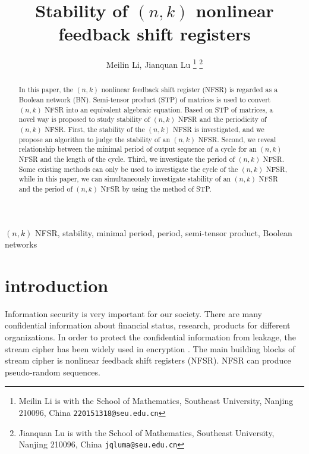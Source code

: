 \documentclass[conference]{IEEEtran}
\title{\LARGE \bf
Stability of $(n,k)$ nonlinear feedback shift registers}
\author{Meilin Li, Jianquan Lu
\thanks{Meilin Li is with the School of Mathematics, Southeast
University, Nanjing 210096, China {\tt\small 220151318@seu.edu.cn}}
\thanks{Jianquan Lu is with the School of Mathematics, Southeast
University, Nanjing 210096, China
{\tt\small jqluma@seu.edu.cn}}}
\begin{document}
\maketitle
\thispagestyle{empty}
\pagestyle{empty}

\begin{abstract}
In this paper, the $(n,k)$ nonlinear feedback shift register (NFSR) is regarded as a Boolean network (BN). Semi-tensor product (STP) of matrices is used to convert $(n,k)$ NFSR into an equivalent algebraic equation. Based on STP of matrices, a novel way is proposed to study stability of $(n,k)$ NFSR and the periodicity of $(n,k)$ NFSR. First, the stability of the $(n,k)$ NFSR is investigated, and we propose an algorithm to judge the stability of an $(n,k)$ NFSR. Second, we reveal relationship between the minimal period of output sequence of a cycle for an $(n,k)$ NFSR and the length of the cycle. Third, we investigate the period of $(n,k)$ NFSR. Some existing methods can only be used to investigate the cycle of the $(n,k)$ NFSR, while in this paper, we can simultaneously investigate stability of an $(n,k)$ NFSR and the period of $(n,k)$ NFSR by using the method of STP.
\end{abstract}

\begin{keywords}
$(n,k)$ NFSR, stability, minimal period, period, semi-tensor product, Boolean networks
\end{keywords}

\section{introduction}
Information security is very important for our society. There are many confidential information about financial status, research, products for different organizations. In order to protect the confidential information from leakage, the stream cipher has been widely used in encryption \cite{Golomb2002Shift}. The main building blocks of stream cipher is nonlinear feedback shift registers (NFSR). NFSR can produce pseudo-random sequences.
\end{document}

